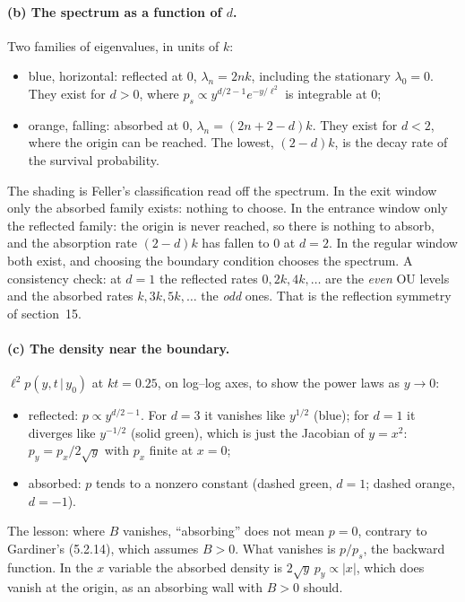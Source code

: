 \documentclass[11pt]{article}
\newcommand{\gv}{\,|\,}
\begin{document}
\paragraph{(b) The spectrum as a function of $d$.} Two families of eigenvalues, in units of $k$:
\begin{itemize}
  \item blue, horizontal: reflected at $0$, $\lambda_n=2nk$, including the stationary $\lambda_0=0$. They exist for
        $d>0$, where $p_s\propto y^{d/2-1}e^{-y/\ell^2}$ is integrable at $0$;
  \item orange, falling: absorbed at $0$, $\lambda_n=(2n+2-d)k$. They exist for $d<2$, where the origin can be
        reached. The lowest, $(2-d)k$, is the decay rate of the survival probability.
\end{itemize}
The shading is Feller's classification read off the spectrum. In the exit window only the absorbed family exists:
nothing to choose. In the entrance window only the reflected family: the origin is never reached, so there is nothing to
absorb, and the absorption rate $(2-d)k$ has fallen to $0$ at $d=2$. In the regular window both exist, and choosing the
boundary condition chooses the spectrum. A consistency check: at $d=1$ the reflected rates $0,2k,4k,\dots$ are the
\emph{even} OU levels and the absorbed rates $k,3k,5k,\dots$ the \emph{odd} ones. That is the reflection symmetry of
section~15.

\paragraph{(c) The density near the boundary.} $\ell^2p(y,t\gv y_0)$ at $kt=0.25$, on log--log axes, to show the power
laws as $y\to0$:
\begin{itemize}
  \item reflected: $p\propto y^{d/2-1}$. For $d=3$ it vanishes like $y^{1/2}$ (blue); for $d=1$ it diverges like
        $y^{-1/2}$ (solid green), which is just the Jacobian of $y=x^2$: $p_y=p_x/2\sqrt y$ with $p_x$ finite at $x=0$;
  \item absorbed: $p$ tends to a nonzero constant (dashed green, $d=1$; dashed orange, $d=-1$).
\end{itemize}
The lesson: where $B$ vanishes, ``absorbing'' does not mean $p=0$, contrary to Gardiner's (5.2.14), which assumes $B>0$.
What vanishes is $p/p_s$, the backward function. In the $x$ variable the absorbed density is $2\sqrt y\,p_y\propto|x|$,
which does vanish at the origin, as an absorbing wall with $B>0$ should.
\end{document}
